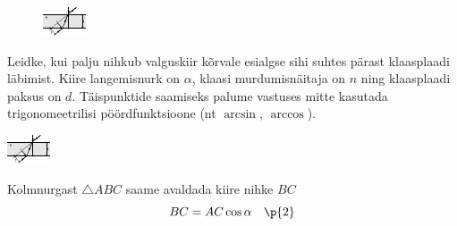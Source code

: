 
\begin{figure}
  \vspace{-2em}
  \begin{center}
    \includegraphics[width=1\linewidth]{2023-v2g-06-yl.pdf}
  \end{center}
  \vspace{-2em}
\end{figure}

Leidke, kui palju nihkub valguskiir kõrvale esialgse sihi suhtes pärast klaasplaadi läbimist. Kiire langemisnurk on $\alpha$, klaasi murdumisnäitaja on $n$ ning klaasplaadi paksus on $d$. Täispunktide saamiseks palume vastuses mitte kasutada trigonomeetrilisi pöördfunktsioone (nt $\arcsin$, $\arccos$).


\hint

\solu
\begin{center}
\includegraphics[width=0.5\linewidth]{2023-v2g-06-yl.pdf}
\end{center}
  
Kolmnurgast $\triangle{ABC}$ saame avaldada kiire nihke $BC$\\
\[ BC = AC \cos{\alpha} \quad \p{2}\]

